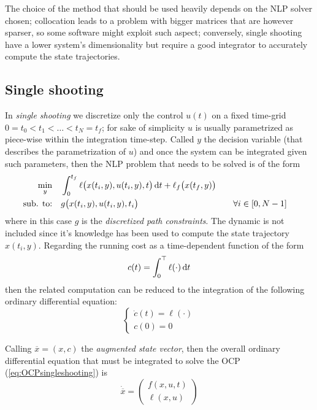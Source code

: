 	The choice of the method that should be used heavily depends on the NLP solver chosen; collocation leads to a problem with bigger matrices that are however sparser, so some software might exploit such aspect; conversely, single shooting have a lower system's dimensionality but require a good integrator to accurately compute the state trajectories.
	
\subsection{Single shooting}
	In \textit{single shooting} we discretize only the control $u(t)$ on a fixed time-grid $0 = t_0 < t_1 < \dots < t_N = t_f$; for sake of simplicity $u$ is usually parametrized as piece-wise within the integration time-step. Called $y$ the decision variable (that describes the parametrization of $u$) and once the system can be integrated given such parameters, then the NLP problem that needs to be solved is of the form
	\begin{equation} \label{eq:OCPsingleshooting}
	\begin{aligned}
		\min_y \quad & \int_0^{t_f} \ell\big( x(t_i,y), u(t_i,y), t \big)\, \mathrm{d} t + \ell_f\big(x(t_f,y)\big) \\
		\textrm{sub. to:} \quad & g\big(x(t_i,y), u(t_i, y), t_i\big) && \quad \forall i \in [0,N-1]
	\end{aligned}
	\end{equation}
	where in this case $g$ is the \textit{discretized path constraints}. The dynamic is not included since it's knowledge has been used to compute the state trajectory $x(t_i, y)$. Regarding the running cost as a time-dependent function of the form
	\[ c(t) = \int_0^\top  \ell(\cdot)\, \mathrm{d} t \]
	then the related computation can be reduced to the integration of the following ordinary differential equation:
	\[ \begin{cases}
		\dot c(t) = \ell(\cdot) \\ c(0) = 0
	\end{cases} \]
	
	Calling $\overline x = (x, c)$ the \textit{augmented state vector}, then the overall ordinary differential equation that must be integrated to solve the OCP (\ref{eq:OCPsingleshooting}) is
	\begin{equation}
		\dot{\overline x} = \begin{pmatrix}
			f(x,u,t) \\ \ell (x, u)
		\end{pmatrix}
	\end{equation}
	
